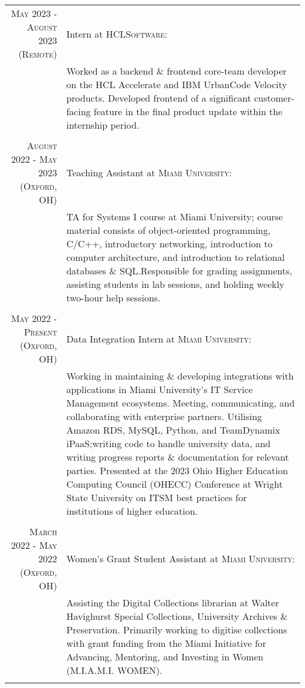 \documentclass[letterpaper,8pt]{article} %
\begin{document}
\footnotesize{\begin{tabular}{r|p{12cm}}

\footnotesize{\textsc{May 2023 - August 2023 (Remote)}} & \footnotesize{Intern at \textsc{HCLSoftware}}:\\
& \footnotesize{Worked as a backend \& frontend core-team developer on the HCL Accelerate and IBM UrbanCode Velocity products. Developed frontend of a significant customer-facing feature in the final product update within the internship period.}\\
\multicolumn{2}{c}{} \\

    
\footnotesize{\textsc{August 2022 - May 2023 (Oxford, OH)}} & \footnotesize{Teaching Assistant at \textsc{Miami University}}:\\
& \footnotesize{TA for Systems I course at Miami University; course material consists of object-oriented programming, C/C++, introductory networking, introduction to computer architecture, and introduction to relational databases \& SQL.\@ Responsible for grading assignments, assisting students in lab sessions, and holding weekly two-hour help sessions.}\\
\multicolumn{2}{c}{} \\


\footnotesize{\textsc{May 2022 - Present (Oxford, OH)}} & \footnotesize{Data Integration Intern at \textsc{Miami University}}:\\
& \footnotesize{Working in maintaining \& developing integrations with applications in Miami University's IT Service Management ecosystems. Meeting, communicating, and collaborating with enterprise partners. Utilising Amazon RDS, MySQL, Python, and TeamDynamix iPaaS;\@ writing code to handle university data, and writing progress reports \& documentation for relevant parties. Presented at the 2023 Ohio Higher Education Computing Council (OHECC) Conference at Wright State University on ITSM best practices for institutions of higher education.}\\
\multicolumn{2}{c}{} \\


\footnotesize{\textsc{March 2022 - May 2022 (Oxford, OH)}} & \footnotesize{Women's Grant Student Assistant at \textsc{Miami University}}:\\
& \footnotesize{Assisting the Digital Collections librarian at Walter Havighurst Special Collections, University Archives \& Preservation. Primarily working to digitise collections with grant funding from the Miami Initiative for Advancing, Mentoring, and Investing in Women (M.I.A.M.I. WOMEN).}\\
\multicolumn{2}{c}{} \\


\end{tabular}}
\end{document}
